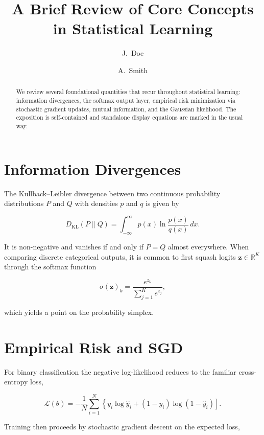 \documentclass[11pt]{article}
\title{A Brief Review of Core Concepts in Statistical Learning}
\author{J.\ Doe \and A.\ Smith}
\date{}
\begin{document}
\maketitle

\begin{abstract}
We review several foundational quantities that recur throughout statistical
learning: information divergences, the softmax output layer, empirical risk
minimization via stochastic gradient updates, mutual information, and the
Gaussian likelihood. The exposition is self-contained and standalone display
equations are marked in the usual way.
\end{abstract}

\section{Information Divergences}

The Kullback--Leibler divergence between two continuous probability
distributions $P$ and $Q$ with densities $p$ and $q$ is given by

\begin{equation}
D_{\mathrm{KL}}(P \| Q) = \int_{-\infty}^{\infty} p(x) \ln \frac{p(x)}{q(x)} \, dx.
\end{equation}

It is non-negative and vanishes if and only if $P = Q$ almost everywhere. When
comparing discrete categorical outputs, it is common to first squash logits
$\mathbf{z} \in \mathbb{R}^K$ through the softmax function

\begin{equation}
\sigma(\mathbf{z})_k = \frac{e^{z_k}}{\sum_{j=1}^{K} e^{z_j}},
\end{equation}

which yields a point on the probability simplex.

\section{Empirical Risk and SGD}

For binary classification the negative log-likelihood reduces to the familiar
cross-entropy loss,

\begin{equation}
\mathcal{L}(\theta) = -\frac{1}{N} \sum_{i=1}^{N} \left\{ y_i \log \hat{y}_i + (1 - y_i) \log(1 - \hat{y}_i) \right].
\end{equation}

Training then proceeds by stochastic gradient descent on the expected loss,
\end{document}
